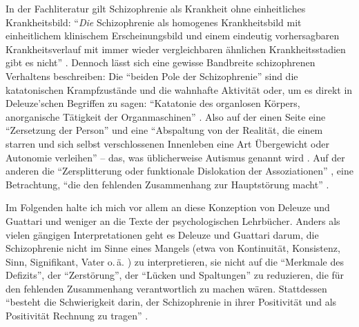 \documentclass[12pt,
               paper=a4,
               twoside=false,
               onehalfspacing,
               bibliography=totoc,
               toc=graduated,
               ]{scrartcl}
\newcommand{\pc}[2]{\parencite[#1]{#2}}
\newcommand{\vgl}[2]{\parencite[vgl.][#1]{#2}}
\newcommand{\worries}[1]{\ifdraft{\textcolor{blue}{\texttt{(#1)}}}{}}
\newcommand{\gwg}{G--W--G'\xspace}
\newcommand{\dg}{Deleuze und Guattari\xspace}
\begin{document}
In der Fachliteratur gilt Schizophrenie als Krankheit ohne
einheitliches Krankheitsbild: "`\emph{Die} Schizophrenie als homogenes
Krankheitsbild mit einheitlichem klinischem Erscheinungsbild und einem
eindeutig vorhersagbaren Krankheitsverlauf mit immer wieder
vergleichbaren ähnlichen Krankheitsstadien gibt es nicht"' \pc{S. 799,
Hervorh. im Orig.}{psych}. Dennoch lässt sich eine gewisse Bandbreite
schizophrenen Verhaltens beschreiben: Die "`beiden Pole der
Schizophrenie"' \pc{21}{schizg} sind die katatonischen Krampfzustände
und die wahnhafte Aktivität oder, um es direkt in Deleuze'schen
Begriffen zu sagen: "`Katatonie des organlosen Körpers, anorganische
Tätigkeit der Organmaschinen"' \pc{21}{schizg}. Also auf der einen
Seite eine "`Zersetzung der Person"' und eine "`Abspaltung von der
Realität, die einem starren und sich selbst verschlossenen Innenleben
eine Art Übergewicht oder Autonomie verleihen"' \pc{23}{schizg} --
das, was üblicherweise Autismus genannt wird \vgl{801}{psych}. Auf der
anderen die "`Zersplitterung oder funktionale Dislokation der
Assoziationen"' \pc{23}{schizg}, eine Betrachtung, "`die den fehlenden
Zusammenhang zur Hauptstörung macht"' \pc{23}{schizg}.


%

Im Folgenden halte ich mich vor allem an diese Konzeption von \dg und
weniger an die Texte der psychologischen Lehrbücher. Anders als vielen
gängigen Interpretationen geht es Deleuze und Guattari darum, die
Schizophrenie nicht im Sinne eines Mangels (etwa von Kontinuität,
Konsistenz, Sinn, Signifikant, Vater o.\,ä. \vgl{24}{schizg})
zu interpretieren, sie nicht auf die "`Merkmale des Defizits"', der
"`Zerstörung"', der "`Lücken und Spaltungen"' \pc{24}{schizg} zu
reduzieren, die für den fehlenden Zusammenhang verantwortlich zu
machen wären. Stattdessen "`besteht die Schwierigkeit darin, der
Schizophrenie in ihrer Positivität und als Positivität Rechnung zu
tragen"' \pc{24}{schizg}.
\end{document}
